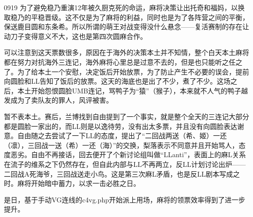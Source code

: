 
0919 为了避免稳乃重演12年被久厨克死的命运，麻将决策让出托奇和福妈，以换取稳乃的平稳晋级。这不仅是为了麻将的利益，同时也是为了各阵营之间的平衡，保送鹿目圆和东条希。所以所谓的萌王对战变得没什么悬念——复活赛制的存在让动刀子变得意义不大，这也是第四次圆麻合作。

可以注意到这天票数很多，原因在于海外的决策本土并不知情，整个白天本土麻将都在努力对抗海外三连记，海外麻将心里总是过意不去的，但是也只能听之任之了。为了给本土一个安慰，决定饭后开始放票，为了防止产生不必要的误会，提前向圆脸和LL告知了饭后的放票。这天的海底也是出了不少，煮了不少。这场之后，本土开始怨恨圆脸UMB连记，骂鸭子为“猿”（猴子），本来就不人气的鸭子越发成为了卖队友的罪人，风评被害。

暂不表本土。赛后，兰博找到自由提到了一个事实，就是整个全天的三连记大部分都是圆脸一家出的，而LL则是以逸待劳，没有出太多票，并且没有向圆脸表达谢意。自由随之去尝试了一下LL的态度，提出了“二回战两送（希、姬）一还（凛），三回战一送（希）一还（海）”的交换，梨落表示不同意并且开始骂人，态度恶劣。自由不再接话，回去便开了个新讨论组叫做“LLanti”，表面上的麻L关系在流子的维系之下仍然存在，但自此内部与LL不再两立，反LL计划讨论出炉——二回战A死海爷，三回战送走小鸟。这是第三次麻L矛盾，也是反LL剧本写成之时。麻将开始暗中蓄力，以求一击必胜之日。

是日，基于手动VG连线的c4vg.php开始派上用场，麻将的领票效率得到了进一步提升。

